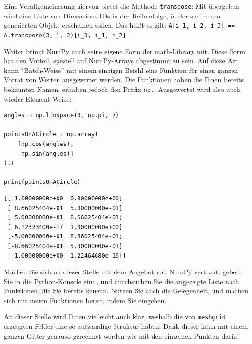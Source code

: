 Eine Verallgemeinerung hiervon bietet die Methode \texttt{transpose}: Mit übergeben wird eine Liste von Dimensions-IDs in der Reihenfolge, in der sie im neu generierten Objekt erscheinen sollen. Das heißt es gilt: \texttt{A[i\_1, i\_2, i\_3] == A.transpose(3, 1, 2)[i\_3, i\_1, i\_2]}.

Weiter bringt NumPy auch seine eigene Form der math-Library mit. Diese Form hat den Vorteil, speziell auf NumPy-Arrays abgestimmt zu sein. Auf diese Art kann \enquote{Batch-Weise} mit einem einzigen Befehl eine Funktion für einen ganzen Vorrat von Werten ausgewertet werden. Die Funktionen haben die Ihnen bereits bekannten Namen, erhalten jedoch den Präfix \texttt{np.}. Ausgewertet wird also auch wieder Element-Weise:

\begin{tcbraster}[raster columns=2,
                  raster equal height,
                  nobeforeafter,
                  raster column skip=0.5cm]
\begin{codebox}
\begin{verbatim}
angles = np.linspace(0, np.pi, 7)

pointsOnACircle = np.array(
    [np.cos(angles),
     np.sin(angles)]
).T

print(pointsOnACircle)
\end{verbatim}
\end{codebox}
%
\begin{cmdbox}
\begin{verbatim}
[[ 1.00000000e+00  0.00000000e+00]
 [ 8.66025404e-01  5.00000000e-01]
 [ 5.00000000e-01  8.66025404e-01]
 [ 6.12323400e-17  1.00000000e+00]
 [-5.00000000e-01  8.66025404e-01]
 [-8.66025404e-01  5.00000000e-01]
 [-1.00000000e+00  1.22464680e-16]]
\end{verbatim}
\end{cmdbox}
\end{tcbraster}

\begin{hintbox}
Machen Sie sich an dieser Stelle mit dem Angebot von NumPy vertraut: geben Sie in die Python-Konsole ein: , und durchsuchen Sie die angezeigte Liste nach Funktionen, die Sie bereits kenenn. Nutzen Sie auch die Gelegenheit, und machen sich mit neuen Funktionen bereit, indem Sie \eg {} eingeben.
\end{hintbox}

An dieser Stelle wird Ihnen vielleicht auch klar, weshalb die von \texttt{meshgrid} erzeugten Felder eine so aufwändige Struktur haben: Dank dieser kann mit einem ganzen Gitter genauso gerechnet werden wie mit den einzelnen Punkten darin!

